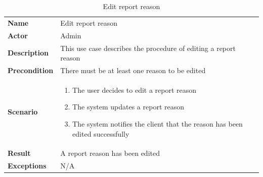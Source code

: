 \begin{table}[ht]
    \caption{Edit report reason}
    \begin{tabular}{|L{5cm}|L{10cm}|}
        \toprule
        \textbf{Name}         & Edit report reason                                               \\
        \textbf{Actor}        & Admin                                                            \\
        \textbf{Description}  & This use case describes the procedure of editing a report reason \\
        \textbf{Precondition} & There must be at least one reason to be edited                   \\
        \textbf{Scenario} &
        \vspace{-0.75cm}
        \begin{enumerate}
            \setlength\itemsep{-0.5em}
            \item The user decides to edit a report reason
            \item The system updates a report reason
            \item The system notifies the client that the reason has been edited successfully
        \end{enumerate} \\[-0.5cm]
        \textbf{Result}       & A report reason has been edited                                  \\
        \textbf{Exceptions}   & N/A                                                              \\
        \bottomrule
    \end{tabular}
    \label{tab:table29}
\end{table}

